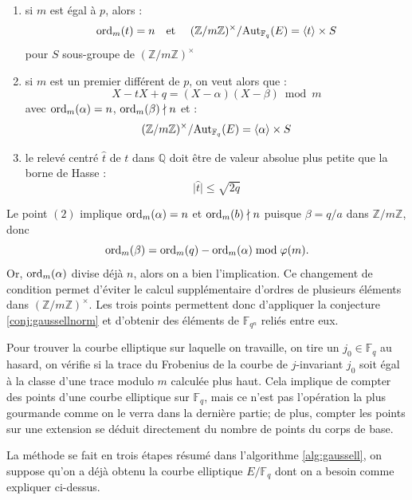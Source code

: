 \documentclass[a4paper]{article} %
\numberwithin{section}{part}
\numberwithin{equation}{section}
\newcommand\zmodn[1]{\mathbb{Z}/#1\mathbb{Z}}
\newcommand\zmodninv[1]{(\mathbb{Z}/#1\mathbb{Z})^{\times}}
\newcommand\GF[1]{\mathbb{F}_{#1}}
\newcommand\QQ{\mathbb{Q}}
\newcommand\etmath{\textup{\quad et \quad}}
\newcommand\groupgen[1]{\langle{#1}\rangle}
\newcommand\ord[2]{\textup{ord}_{#1}(#2)}
\begin{document}
\vspace{0.3cm}
\begin{enumerate}[(1)]
    \item si $m$ est égal à $p$, alors :
	\begin{equation}
	\ord{m}{t} = n \etmath\zmodninv{m}/\textup{Aut}_{\GF{q}}(E) = 
	\groupgen{t}\times S
	\end{equation}
	pour $S$ sous-groupe de $\zmodninv{m}$
    \item si $m$ est un premier différent de $p$, on veut alors que :
	\begin{equation}
	X - tX + q = (X - \alpha)(X - \beta)\bmod{m}
	\end{equation}
	avec $\ord{m}{\alpha} = n$, $\ord{m}{\beta}\nmid n$ et :
	\begin{equation}
    \zmodninv{m}/\textup{Aut}_{\GF{q}}(E) = \groupgen{\alpha}\times S
	\end{equation}
	\item le relevé centré $\hat{t}$ de $t$ dans $\QQ$ doit être de valeur
absolue plus petite que la borne de Hasse :
	\begin{equation}
	\vert{\hat{t}}\vert \leq \sqrt{2q}
	\end{equation}
    \end{enumerate}
\vspace{0.3cm}
Le point $(2)$ implique $\ord{m}{\alpha} = n$ et $\ord{m}{b}\nmid n$ 
puisque $\beta = q/a$ dans $\zmodn{m}$, donc 
\begin{equation}
\ord{m}{\beta} = \ord{m}{q} - \ord{m}{\alpha}\bmod{\varphi(m)}.
\end{equation}
Or, $\ord{m}{\alpha}$ divise déjà $n$, alors on a bien l'implication. Ce
changement de condition permet d'éviter le calcul supplémentaire d'ordres
de plusieurs éléments dans $\zmodninv{m}$. Les trois points permettent donc 
d'appliquer la conjecture \ref{conj:gaussellnorm} et d'obtenir des éléments de 
$\GF{q^n}$ reliés entre eux.\par
Pour trouver la courbe elliptique sur laquelle on travaille, on tire un
$j_0\in\GF{q}$ au hasard, on vérifie si la trace du Frobenius de la courbe de
$j$-invariant $j_0$ soit égal à la classe d'une trace modulo $m$ calculée plus 
haut. Cela implique de compter des points d'une courbe elliptique sur $\GF{q}$,
mais ce n'est pas l'opération la plus gourmande comme on le verra dans la
dernière partie; de plus, compter les points sur une extension se déduit
directement du nombre de points du corps de base.\par 
La méthode se fait en trois étapes résumé dans l'algorithme \ref{alg:gaussell}, 
on suppose qu'on a déjà obtenu la courbe elliptique $E/\GF{q}$ dont on a besoin
comme expliquer ci-dessus.\par
\end{document}
